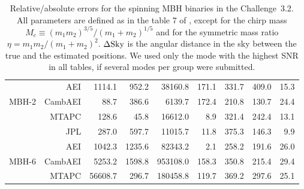 \documentclass{iopart}
\begin{document}
\begin{table}
\begin{center}
\begin{tabular}{lr|rrrrrrr}
\hline
                & AEI            & 1114.1 & 952.2 & 38160.8 & 171.1 & 331.7 & 409.0 &  15.3 \\
MBH-2   & CambAEI &      88.7 & 386.6 &   6139.7 & 172.4 & 210.8 & 130.7 &  24.4  \\
                & MTAPC    &   128.6 &   45.8 & 16612.0 &      8.9 & 321.4 & 242.4 &  13.1  \\
                & JPL           &   287.0 & 597.7 & 11015.7 &   11.8 & 375.3 & 146.3 &    9.9 \\

\hline
                & AEI            &    1042.3 & 1235.6 &   82343.2 &      2.1 & 258.2 & 191.6 & 26.0  \\
MBH-6   & CambAEI &    5253.2 & 1598.8 & 953108.0 & 158.3 & 350.8 & 215.4 & 29.4  \\
                & MTAPC    & 56608.7 &    296.7 & 180458.8 & 119.7 & 369.2 & 297.6 & 25.1  \\


\hline
\end{tabular}
\end{center}
\caption{ Relative/absolute errors for the spinning MBH binaries in the Challenge~3.2. All parameters are defined as in the table 7 of \cite{MLDC3}, except for the chirp mass $M_c \equiv (m_1 m_2)^{3/5} / (m_1 + m_2)^{1/5}$ and for the symmetric mass ratio $\eta = m_1 m_2 / (m_1 + m_2)^{2}$.  $ \Delta \textmd{Sky}$ is the angular distance in the sky between 
the true and the estimated positions. We used only the mode with the highest SNR in all tables, if several modes per group were submitted.
\label{tab:SMBH_Err}}
\end{table} 
\end{document}
